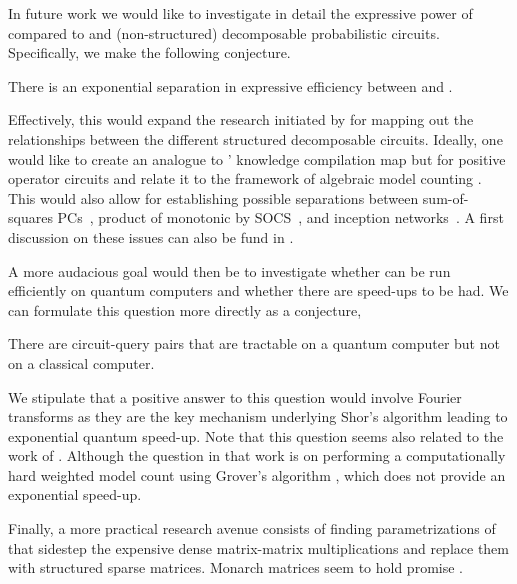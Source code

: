 In future work we would like to investigate in detail the expressive power of \dpuncs compared to \sdpuncs and (non-structured) decomposable probabilistic circuits. Specifically, we make the following conjecture.

\begin{conjecture}
	There is an exponential separation in expressive efficiency between \dpuncs and \sdpuncs.
\end{conjecture}

Effectively, this would expand the research initiated by \citet{loconte2024subtractive} for mapping out the relationships between the different structured decomposable circuits. Ideally, one would like to create an analogue to \citeauthor{darwiche2002knowledge}' knowledge compilation map \citep{darwiche2002knowledge} but for positive operator circuits and relate it to the framework of algebraic model counting \citep{kimmig2017algebraic}.
This would also allow for establishing possible separations between sum-of-squares PCs~\citep{loconte2024subtractive}, product of monotonic by SOCS~\citep[Definition 5]{loconte2024subtractive}, and inception networks~\citep{wangrelationship}.
A first discussion on these issues can also be fund in \citep[Appendix A]{wangrelationship}.




A more audacious goal would then be to investigate whether \puncs can be run efficiently on quantum computers and whether there are speed-ups to be had. We can formulate this question more directly as a conjecture,

\begin{conjecture}
	There are circuit-query pairs that are tractable on a quantum computer but not on a classical computer.
\end{conjecture}


We stipulate that a positive answer to this question would involve Fourier transforms as they are the key mechanism underlying Shor's algorithm \citep{shor1994algorithms} leading to exponential quantum speed-up.
Note that this question seems also related to the work of \citet{riguzzi2024quantum}. Although the question in that work is on performing a computationally hard weighted model count using Grover's algorithm \citep{grover1996fast}, which does not provide an exponential speed-up.

Finally, a more practical research avenue consists of finding parametrizations of \puncs that sidestep the expensive dense matrix-matrix multiplications and replace them with structured sparse matrices. Monarch matrices seem to hold promise \citep{dao2022monarch,ZhangCoLoRAI25b}.

















